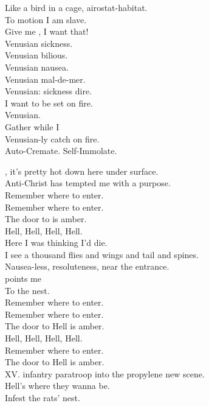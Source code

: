 Like a bird in a cage, airostat-habitat. \\
To motion I am slave. \\
Give me , I want that! \\
Venusian sickness. \\
Venusian bilious. \\
Venusian nausea. \\
Venusian mal-de-mer. \\

Venusian: sickness dire. \\
I want to be set on fire. \\
Venusian. \\
Gather while I \\
Venusian-ly catch on fire. \\

Auto-Cremate. Self-Immolate. \\





, it's pretty hot down here under surface. \\
Anti-Christ has tempted me with a purpose. \\

Remember where to enter. \\
Remember where to enter. \\
The door to  is amber. \\

Hell, Hell, Hell, Hell. \\

Here I was thinking I'd die. \\
I see a thousand flies and wings and tail and spines. \\

Nausea-less, resoluteness, near the entrance. \\
 points me \\
To the  nest. \\

Remember where to enter.\\
Remember where to enter. \\
The door to Hell is amber. \\

Hell, Hell, Hell, Hell. \\

Remember where to enter. \\
The door to Hell is amber. \\

XV. infantry paratroop into the propylene new scene. \\
Hell's where they wanna be. \\
Infest the rats' nest. \\
